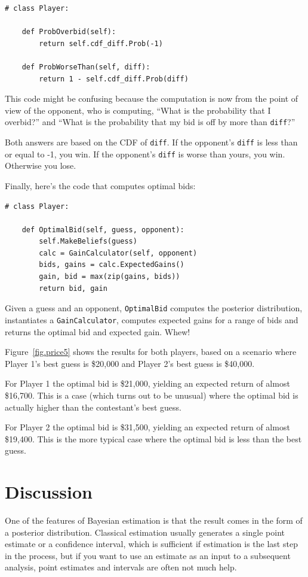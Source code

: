 \documentclass[12pt]{book}
\begin{document}
\begin{verbatim}
# class Player:

    def ProbOverbid(self):
        return self.cdf_diff.Prob(-1)

    def ProbWorseThan(self, diff):
        return 1 - self.cdf_diff.Prob(diff)
\end{verbatim}

This code might be confusing because the computation is now from
the point of view of the opponent, who is computing, ``What is
the probability that I overbid?'' and ``What is the probability
that my bid is off by more than {\tt diff}?''

Both answers are based on the CDF of {\tt diff}.  If the opponent's
{\tt diff} is less than or equal to -1, you win.  If the opponent's
{\tt diff} is worse than yours, you win.  Otherwise you lose.

Finally, here's the code that computes optimal bids:

\begin{verbatim}
# class Player:

    def OptimalBid(self, guess, opponent):
        self.MakeBeliefs(guess)
        calc = GainCalculator(self, opponent)
        bids, gains = calc.ExpectedGains()
        gain, bid = max(zip(gains, bids))
        return bid, gain
\end{verbatim}

Given a guess and an opponent, {\tt OptimalBid} computes
the posterior distribution, instantiates a {\tt GainCalculator},
computes expected gains for a range of bids and returns
the optimal bid and expected gain.  Whew!

Figure~\ref{fig.price5} shows the results for both players,
based on a scenario where Player 1's best guess is \$20,000
and Player 2's best guess is \$40,000.

For Player 1 the optimal bid is \$21,000, yielding an expected
return of almost \$16,700.  This is a case (which turns out
to be unusual) where the optimal bid is actually higher than
the contestant's best guess.

For Player 2 the optimal bid is \$31,500, yielding an expected
return of almost \$19,400.  This is the more typical case where
the optimal bid is less than the best guess.


\section{Discussion}

One of the features of Bayesian estimation is that the
result comes in the form of a posterior distribution.  Classical
estimation usually generates a single point estimate or a confidence
interval, which is sufficient if estimation is the last step in the
process, but if you want to use an estimate as an input to a
subsequent analysis, point estimates and intervals are often not much
help.
\end{document}
